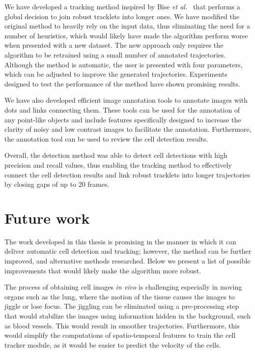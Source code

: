 We have developed a tracking method inspired by Bise \emph{et al.}~\cite{bise11global} that performs a global decision to join robust tracklets into longer ones. We have modified the original method to heavily rely on the input data, thus eliminating the need for a number of heuristics, which would likely have made the algorithm perform worse when presented with a new dataset. The new approach only requires the algorithm to be retrained using a small number of annotated trajectories. Although the method is automatic, the user is presented with four parameters, which can be adjusted to improve the generated trajectories. Experiments designed to test the performance of the method have shown promising results.

We have also developed efficient image annotation tools to annotate images with dots and links connecting them. These tools can be used for the annotation of any point-like objects and include features specifically designed to increase the clarity of noisy and low contrast images to facilitate the annotation. Furthermore, the annotation tool can be used to review the cell detection results.

Overall, the detection method was able to detect cell detections with high precision and recall values, thus enabling the tracking method to effectively connect the cell detection results and link robust tracklets into longer trajectories by closing gaps of up to 20 frames.

\section{Future work}
\label{sec:conclusion_futurework}

The work developed in this thesis is promising in the manner in which it can deliver automatic cell detection and tracking; however, the method can be further improved, and alternative methods researched. Below we present a list of possible improvements that would likely make the algorithm more robust.

The process of obtaining cell images \textit{in vivo} is challenging especially in moving organs such as the lung, where the motion of the tissue causes the images to jiggle or lose focus. The jiggling can be eliminated using a pre-processing step that would stabilize the images using information hidden in the background, such as blood vessels. This would result in smoother trajectories. Furthermore, this would simplify the computations of spatio-temporal features to train the cell tracker module, as it would be easier to predict the velocity of the cells.

